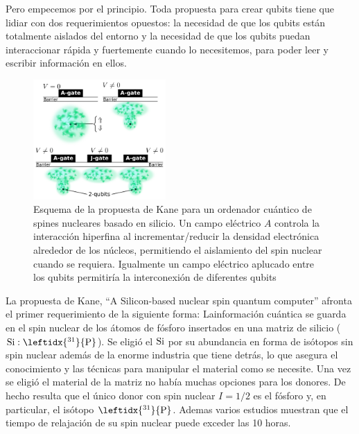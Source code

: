 Pero empecemos por el principio. Toda propuesta para crear qubits tiene que lidiar con dos requerimientos opuestos: la necesidad de que los qubits están totalmente aislados del entorno y la necesidad de que los qubits puedan interaccionar rápida y fuertemente cuando lo necesitemos, para poder leer y escribir información en ellos.
\begin{figure}
\centering
\vspace{-10pt}
\includegraphics[width=0.45\textwidth]{introduction/figures/kane.pdf}
\vspace{-7pt}
\caption{Esquema de la propuesta de Kane para un ordenador cuántico de spines nucleares basado en silicio. Un campo eléctrico $A$ controla la interacción hiperfina al incrementar/reducir la densidad electrónica alrededor de los núcleos, permitiendo el aislamiento del spin nuclear cuando se requiera. Igualmente un campo eléctrico aplucado entre los qubits permitiría la interconexión de diferentes qubits}
\label{kane_proposal}
\end{figure}
\FloatBarrier
La propuesta de Kane\cite{Kane1988}, ``A Silicon-based nuclear spin quantum computer'' afronta el primer requerimiento de la siguiente forma: Lainformación cuántica se guarda en el spin nuclear de los átomos de fósforo insertados en una matriz de silicio ($\ce{Si}:\leftidx{^{31}}{\ce{P}}$). Se eligió el $\ce{Si}$ por su abundancia en forma de isótopos sin spin nuclear además de la enorme industria que tiene detrás, lo que asegura el conocimiento y las técnicas para manipular el material como se necesite. Una vez se eligió el material de la matriz no había muchas opciones para los donores. De hecho resulta que el único donor con spin nuclear $I=1/2$  es el fósforo\cite{Feher1959,Wilson1961} y, en particular, el isótopo $\leftidx{^{31}}{\ce{P}}$. Ademas varios estudios muestran que el tiempo de relajación de su spin nuclear puede exceder las 10 horas.\cite{Feher1959, Wilson1961, Waugh1988}

